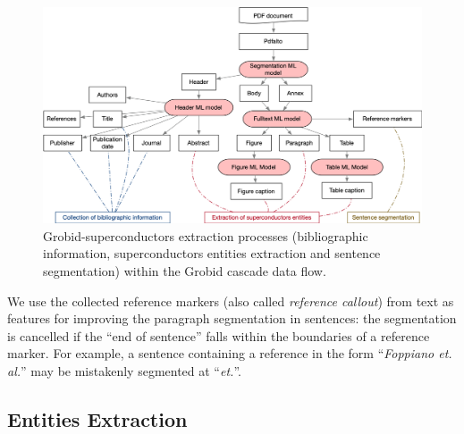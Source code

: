 \documentclass[]{interact}
\theoremstyle{plain}%
\theoremstyle{definition}
\theoremstyle{remark}
\begin{document}
\begin{figure}[ht]
    \includegraphics[width=\textwidth]{document-structuring-colors}
    \caption{Grobid-superconductors extraction processes (bibliographic information, superconductors entities extraction and sentence segmentation) within the Grobid cascade data flow.}
    \label{fig:grobid-document-processing}
\end{figure}

We use the collected reference markers (also called \textit{reference callout}) from text as features for improving the paragraph segmentation in sentences: the segmentation is cancelled if the ``end of sentence'' falls within the boundaries of a reference marker.
For example, a sentence containing a reference in the form ``\textit{Foppiano et. al.}'' may be mistakenly segmented at ``\textit{et.}''.



\subsection{Entities Extraction}
\label{subsubsec:extraction}
\end{document}
